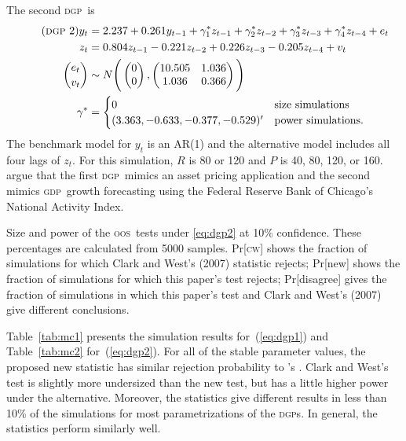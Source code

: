 \documentclass[12pt,fleqn]{article}
\newcommand\citepos[2][]{\citeauthor{#2}'s \citeyearpar[#1]{#2}}
\theoremstyle{definition}
\newcommand{\dgp}{\textsc{dgp}}
\newcommand{\gdp}{\textsc{gdp}}
\newcommand{\oos}{\textsc{oos}}
\begin{document}
The second \dgp\ is
\begin{align} \label{eq:dgp2}\tag{\dgp\ 2}
  y_{t} &= 2.237 + 0.261 y_{t-1} + \gamma^{*}_{1} z_{t-1} + \gamma_{2}^{*}
  z_{t-2} + \gamma_{3}^{*} z_{t-3} + \gamma_{4}^{*} z_{t-4} + e_{t} \\
  z_{t} &= 0.804 z_{t-1} - 0.221 z_{t-2} + 0.226 z_{t-3} - 0.205
  z_{t-4} + v_{t} \nonumber \\
  \binom{e_{t}}{v_{t}} &\sim N\Bigg(
  \begin{pmatrix}
    0 \\ 0
  \end{pmatrix},
  \begin{pmatrix}
    10.505 & 1.036 \\ 1.036 & 0.366
  \end{pmatrix}
  \Bigg) \nonumber\\\nonumber
  \gamma^{*} &=
  \begin{cases}
    0 & \text{size simulations}\\
    (3.363, -0.633, -0.377, -0.529)' & \text{power simulations}.
  \end{cases}
\end{align}
The benchmark model for $y_{t}$ is an AR(1) and the alternative model
includes all four lags of $z_{t}$.  For this simulation, $R$ is 80 or
120 and $P$ is 40, 80, 120, or 160.  \citet{ClW:07} argue that the
first \dgp\ mimics an asset pricing application and the second mimics
\gdp\ growth forecasting using the Federal Reserve Bank of Chicago's
National Activity Index.

\begin{table}[tb]
  \centering
  
\caption{Size and power of the \oos\ tests under \eqref{eq:dgp2} at
  10\% confidence.  These percentages are calculated from 5000
  samples.  Pr[\textsc{cw}] shows the fraction of simulations for which Clark
  and West's (2007) statistic rejects; Pr[new] shows the fraction of
  simulations for which this paper's test rejects; Pr[disagree] gives
  the fraction of simulations in which this paper's test and Clark and
  West's (2007) give different conclusions.}
\label{tab:mc2}
\end{table}

Table~\ref{tab:mc1} presents the simulation results
for~(\ref{eq:dgp1}) and Table~\ref{tab:mc2} for~(\ref{eq:dgp2}).  For
all of the stable parameter values, the proposed new statistic has
similar rejection probability to \citepos{ClW:07}.  Clark and West's
test is slightly more undersized than the new test, but has a little
higher power under the alternative.  Moreover, the statistics give
different results in less than 10\% of the simulations for most
parametrizations of the \dgp s.  In general, the statistics perform
similarly well.
\end{document}
